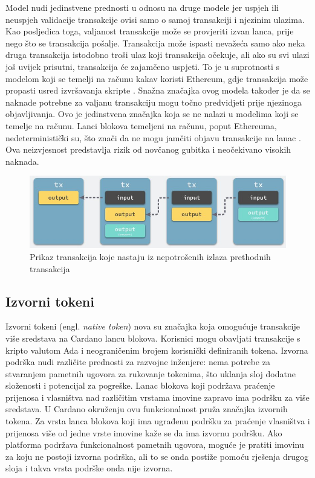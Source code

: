 \documentclass[times, utf8, diplomski]{fer}
\begin{document}
Model nudi jedinstvene prednosti u odnosu na druge modele jer uspjeh ili neuspjeh validacije transakcije ovisi samo o samoj transakciji i njezinim ulazima. Kao posljedica toga, valjanost transakcije može se provjeriti izvan lanca, prije nego što se transakcija pošalje. Transakcija može ispasti nevažeća samo ako neka druga transakcija istodobno troši ulaz koji transakcija očekuje, ali ako su svi ulazi još uvijek prisutni, transakcija će zajamčeno uspjeti. To je u suprotnosti s modelom koji se temelji na računu kakav koristi Ethereum, gdje transakcija može propasti usred izvršavanja skripte \cite{antonopoulos2018mastering}. Snažna značajka ovog modela također je da se naknade potrebne za valjanu transakciju mogu točno predvidjeti prije njezinoga objavljivanja. Ovo je jedinstvena značajka koja se ne nalazi u modelima koji se temelje na računu. Lanci blokova temeljeni na računu, poput Ethereuma, nedeterministički su, što znači da ne mogu jamčiti objavu transakcije na lanac \cite{wood2014ethereum}. Ova neizvjesnost predstavlja rizik od novčanog gubitka i neočekivano visokih naknada.

\begin{figure}[htb]
\centering
\includegraphics[width=\linewidth]{img/2018-04-05-transactions-in-utxo-model.jpg}
\caption{Prikaz transakcija koje nastaju iz nepotrošenih izlaza prethodnih transakcija \cite{blogcsdnnet}}
\label{fig:eutxo-diagram}
\end{figure}

\subsection{Izvorni tokeni}

Izvorni tokeni (engl. \emph{native token}) nova su značajka koja omogućuje transakcije više sredstava na Cardano lancu blokova. Korisnici mogu obavljati transakcije s kripto valutom Ada i neograničenim brojem korisnički definiranih tokena. Izvorna podrška nudi različite prednosti za razvojne inženjere: nema potrebe za stvaranjem pametnih ugovora za rukovanje tokenima, što uklanja sloj dodatne složenosti i potencijal za pogreške. Lanac blokova koji podržava praćenje prijenosa i vlasništva nad različitim vrstama imovine zapravo ima podršku za više sredstava. U Cardano okruženju ovu funkcionalnost pruža značajka izvornih tokena. Za vrsta lanca blokova koji ima ugrađenu podršku za praćenje vlasništva i prijenosa više od jedne vrste imovine kaže se da ima izvornu podršku. Ako platforma podržava funkcionalnost pametnih ugovora, moguće je pratiti imovinu za koju ne postoji izvorna podrška, ali to se onda postiže pomoću rješenja drugog sloja i takva vrsta podrške onda nije izvorna.
\end{document}
